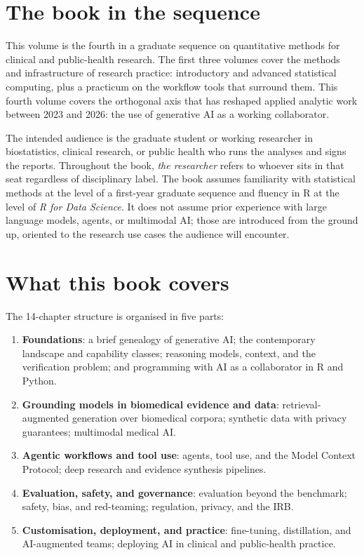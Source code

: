 \documentclass[
  letterpaper,
  11pt]{scrbook}
\providecommand{\tightlist}{%
  \setlength{\itemsep}{0pt}\setlength{\parskip}{0pt}}
\begin{document}
\section*{The book in the sequence}\label{the-book-in-the-sequence}


This volume is the fourth in a graduate sequence on quantitative methods
for clinical and public-health research. The first three volumes cover
the methods and infrastructure of research practice: introductory and
advanced statistical computing, plus a practicum on the workflow tools
that surround them. This fourth volume covers the orthogonal axis that
has reshaped applied analytic work between 2023 and 2026: the use of
generative AI as a working collaborator.

The intended audience is the graduate student or working researcher in
biostatistics, clinical research, or public health who runs the analyses
and signs the reports. Throughout the book, \emph{the researcher} refers
to whoever sits in that seat regardless of disciplinary label. The book
assumes familiarity with statistical methods at the level of a
first-year graduate sequence and fluency in R at the level of \emph{R
for Data Science}. It does not assume prior experience with large
language models, agents, or multimodal AI; those are introduced from the
ground up, oriented to the research use cases the audience will
encounter.

\section*{What this book covers}\label{what-this-book-covers}


The 14-chapter structure is organised in five parts:

\begin{enumerate}
\def\labelenumi{\arabic{enumi}.}
\tightlist
\item
  \textbf{Foundations}: a brief genealogy of generative AI; the
  contemporary landscape and capability classes; reasoning models,
  context, and the verification problem; and programming with AI as a
  collaborator in R and Python.
\item
  \textbf{Grounding models in biomedical evidence and data}:
  retrieval-augmented generation over biomedical corpora; synthetic data
  with privacy guarantees; multimodal medical AI.
\item
  \textbf{Agentic workflows and tool use}: agents, tool use, and the
  Model Context Protocol; deep research and evidence synthesis
  pipelines.
\item
  \textbf{Evaluation, safety, and governance}: evaluation beyond the
  benchmark; safety, bias, and red-teaming; regulation, privacy, and the
  IRB.
\item
  \textbf{Customisation, deployment, and practice}: fine-tuning,
  distillation, and AI-augmented teams; deploying AI in clinical and
  public-health practice.
\end{enumerate}
\end{document}
